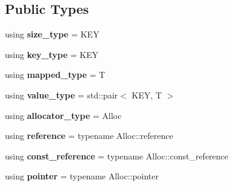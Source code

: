 \subsection*{Public Types}
\begin{DoxyCompactItemize}
\item 
\hypertarget{classtheoria_1_1util_1_1densemap_a133075e61db44e086c734c8a32ca6ab2}{using {\bfseries size\+\_\+type} = K\+E\+Y}\label{classtheoria_1_1util_1_1densemap_a133075e61db44e086c734c8a32ca6ab2}

\item 
\hypertarget{classtheoria_1_1util_1_1densemap_afd285a46dc8f45b4b1556a656708d2a7}{using {\bfseries key\+\_\+type} = K\+E\+Y}\label{classtheoria_1_1util_1_1densemap_afd285a46dc8f45b4b1556a656708d2a7}

\item 
\hypertarget{classtheoria_1_1util_1_1densemap_a8c1e5a57a1e76089bd675da3fa3347d8}{using {\bfseries mapped\+\_\+type} = T}\label{classtheoria_1_1util_1_1densemap_a8c1e5a57a1e76089bd675da3fa3347d8}

\item 
\hypertarget{classtheoria_1_1util_1_1densemap_a6d2419665695def56b2abbd849f74b08}{using {\bfseries value\+\_\+type} = std\+::pair$<$ K\+E\+Y, T $>$}\label{classtheoria_1_1util_1_1densemap_a6d2419665695def56b2abbd849f74b08}

\item 
\hypertarget{classtheoria_1_1util_1_1densemap_ae12f4688e504c8759e23759ad7272c94}{using {\bfseries allocator\+\_\+type} = Alloc}\label{classtheoria_1_1util_1_1densemap_ae12f4688e504c8759e23759ad7272c94}

\item 
\hypertarget{classtheoria_1_1util_1_1densemap_a20361bfcacef17947099d8580befbbdc}{using {\bfseries reference} = typename Alloc\+::reference}\label{classtheoria_1_1util_1_1densemap_a20361bfcacef17947099d8580befbbdc}

\item 
\hypertarget{classtheoria_1_1util_1_1densemap_a7a3dd11d6fd160c467c43d2029c3592a}{using {\bfseries const\+\_\+reference} = typename Alloc\+::const\+\_\+reference}\label{classtheoria_1_1util_1_1densemap_a7a3dd11d6fd160c467c43d2029c3592a}

\item 
\hypertarget{classtheoria_1_1util_1_1densemap_ae892a1fc35162971bb0278c7904995c6}{using {\bfseries pointer} = typename Alloc\+::pointer}\label{classtheoria_1_1util_1_1densemap_ae892a1fc35162971bb0278c7904995c6}


\end{DoxyCompactItemize}
